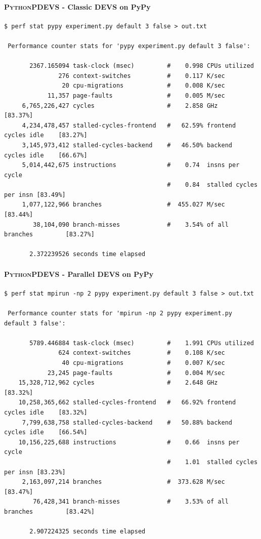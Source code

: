 \documentclass[8pt,a4paper]{report}
\begin{document}
\paragraph{\textsc{PythonPDEVS} - Classic DEVS on PyPy}
\begin{Verbatim}[fontsize=\small]
$ perf stat pypy experiment.py default 3 false > out.txt

 Performance counter stats for 'pypy experiment.py default 3 false':

       2367.165094 task-clock (msec)         #    0.998 CPUs utilized          
               276 context-switches          #    0.117 K/sec                  
                20 cpu-migrations            #    0.008 K/sec                  
            11,357 page-faults               #    0.005 M/sec                  
     6,765,226,427 cycles                    #    2.858 GHz                     [83.37%]
     4,234,478,457 stalled-cycles-frontend   #   62.59% frontend cycles idle    [83.27%]
     3,145,973,412 stalled-cycles-backend    #   46.50% backend  cycles idle    [66.67%]
     5,014,442,675 instructions              #    0.74  insns per cycle        
                                             #    0.84  stalled cycles per insn [83.49%]
     1,077,122,966 branches                  #  455.027 M/sec                   [83.44%]
        38,104,090 branch-misses             #    3.54% of all branches         [83.27%]

       2.372239526 seconds time elapsed
\end{Verbatim}
\paragraph{\textsc{PythonPDEVS} - Parallel DEVS on PyPy}
\begin{Verbatim}[fontsize=\small]
$ perf stat mpirun -np 2 pypy experiment.py default 3 false > out.txt

 Performance counter stats for 'mpirun -np 2 pypy experiment.py default 3 false':

       5789.446884 task-clock (msec)         #    1.991 CPUs utilized          
               624 context-switches          #    0.108 K/sec                  
                40 cpu-migrations            #    0.007 K/sec                  
            23,245 page-faults               #    0.004 M/sec                  
    15,328,712,962 cycles                    #    2.648 GHz                     [83.32%]
    10,258,365,662 stalled-cycles-frontend   #   66.92% frontend cycles idle    [83.32%]
     7,799,638,758 stalled-cycles-backend    #   50.88% backend  cycles idle    [66.54%]
    10,156,225,688 instructions              #    0.66  insns per cycle        
                                             #    1.01  stalled cycles per insn [83.23%]
     2,163,097,214 branches                  #  373.628 M/sec                   [83.47%]
        76,428,341 branch-misses             #    3.53% of all branches         [83.42%]

       2.907224325 seconds time elapsed
\end{Verbatim}
\end{document}
